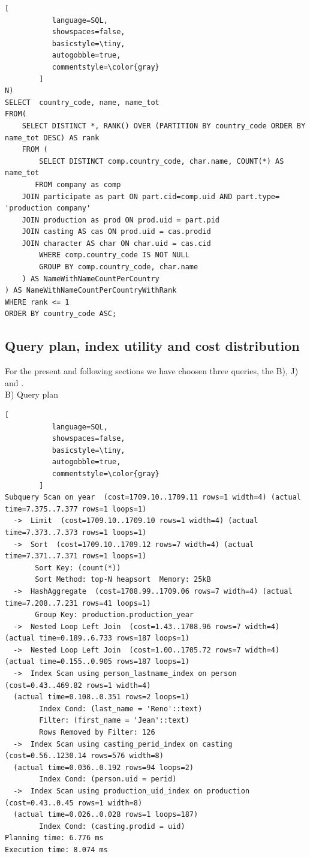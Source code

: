 \documentclass{article}
\begin{document}
\begin{lstlisting}[
           language=SQL,
           showspaces=false,
           basicstyle=\tiny,
           autogobble=true,
           commentstyle=\color{gray}
        ]
N)
SELECT  country_code, name, name_tot
FROM(
    SELECT DISTINCT *, RANK() OVER (PARTITION BY country_code ORDER BY name_tot DESC) AS rank
    FROM (
        SELECT DISTINCT comp.country_code, char.name, COUNT(*) AS name_tot
       FROM company as comp
	JOIN participate as part ON part.cid=comp.uid AND part.type= 'production company'
	JOIN production as prod ON prod.uid = part.pid
	JOIN casting AS cas ON prod.uid = cas.prodid
	JOIN character AS char ON char.uid = cas.cid
        WHERE comp.country_code IS NOT NULL
        GROUP BY comp.country_code, char.name
    ) AS NameWithNameCountPerCountry
) AS NameWithNameCountPerCountryWithRank
WHERE rank <= 1
ORDER BY country_code ASC;
    \end{lstlisting}

\subsection{Query plan, index utility and cost distribution}

For the present and following sections we have choosen three queries, the B), J) and .\\

B) Query plan \\
\begin{lstlisting}[
           language=SQL,
           showspaces=false,
           basicstyle=\tiny,
           autogobble=true,
           commentstyle=\color{gray}
        ]
Subquery Scan on year  (cost=1709.10..1709.11 rows=1 width=4) (actual time=7.375..7.377 rows=1 loops=1)
  ->  Limit  (cost=1709.10..1709.10 rows=1 width=4) (actual time=7.373..7.373 rows=1 loops=1)
  ->  Sort  (cost=1709.10..1709.12 rows=7 width=4) (actual time=7.371..7.371 rows=1 loops=1)
       Sort Key: (count(*))
       Sort Method: top-N heapsort  Memory: 25kB
  ->  HashAggregate  (cost=1708.99..1709.06 rows=7 width=4) (actual time=7.208..7.231 rows=41 loops=1)
       Group Key: production.production_year
  ->  Nested Loop Left Join  (cost=1.43..1708.96 rows=7 width=4) (actual time=0.189..6.733 rows=187 loops=1)
  ->  Nested Loop Left Join  (cost=1.00..1705.72 rows=7 width=4) (actual time=0.155..0.905 rows=187 loops=1)
  ->  Index Scan using person_lastname_index on person  (cost=0.43..469.82 rows=1 width=4)
  (actual time=0.108..0.351 rows=2 loops=1)
        Index Cond: (last_name = 'Reno'::text)
        Filter: (first_name = 'Jean'::text)
        Rows Removed by Filter: 126
  ->  Index Scan using casting_perid_index on casting  (cost=0.56..1230.14 rows=576 width=8)
  (actual time=0.036..0.192 rows=94 loops=2)
        Index Cond: (person.uid = perid)
  ->  Index Scan using production_uid_index on production  (cost=0.43..0.45 rows=1 width=8)
  (actual time=0.026..0.028 rows=1 loops=187)
        Index Cond: (casting.prodid = uid)
Planning time: 6.776 ms
Execution time: 8.074 ms
    \end{lstlisting}
\end{document}

